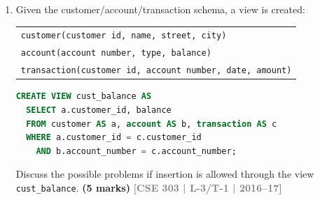 \documentclass[12pt,a3paper]{article}
\newcommand{\yr}[1]{\hfill\textcolor{gray}{\small\textbf{[#1]}}}
\newcommand{\mk}[1]{\textcolor{orange!70!black}{\small\textbf{(#1 marks)}}}
\begin{document}
\begin{enumerate}
\item Given the customer/account/transaction schema, a view is created:
\begin{center}
  \begin{tabular}{l}
    \texttt{customer(customer id, name, street, city)}\\
    \texttt{account(account number, type, balance)}\\
    \texttt{transaction(customer id, account number, date, amount)}
  \end{tabular}
\end{center}

\begin{lstlisting}[language=SQL]
CREATE VIEW cust_balance AS
  SELECT a.customer_id, balance
  FROM customer AS a, account AS b, transaction AS c
  WHERE a.customer_id = c.customer_id
    AND b.account_number = c.account_number;
\end{lstlisting}
Discuss the possible problems if insertion is allowed through the view \texttt{cust\_balance}.
\mk{5} \yr{CSE 303 | L-3/T-1 | 2016--17}


\end{enumerate}
\end{document}

